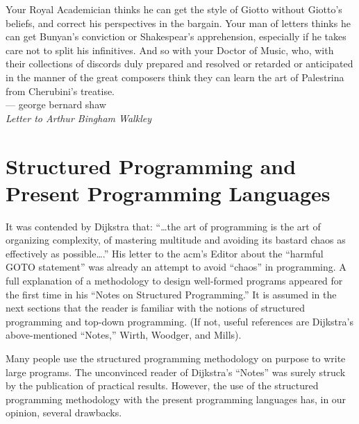 \documentclass[openany,nobib]{tufte-book}
\begin{document}
\newpage\thispagestyle{empty}


\vspace*{\fill}

\begin{flushright}{
    Your Royal Academician thinks he can get the
    style of Giotto without Giotto's beliefs, and
    correct his perspectives in the bargain. Your
    man of letters thinks he can get Bunyan's
    conviction or Shakespear's apprehension,
    especially if he takes care not to split his
    infinitives. And so with your Doctor of Music,
    who, with their collections of discords duly
    prepared and resolved or retarded or anticipated
    in the manner of the great composers think they
    can learn the art of Palestrina from
    Cherubini's treatise.} \\ \medskip
    --- {\sc \large george bernard shaw} \\
    {\sl Letter to Arthur Bingham Walkley}
\end{flushright}

\chapter[Structured Programming and Present Programming Languages]{Structured
Programming and\\Present Programming Languages}\label{ch:introduction}

It was contended by Dijkstra that: ``\dots the art of programming is the art of
organizing complexity, of mastering multitude and avoiding its bastard chaos as
effectively as possible\dots.''\autocite{dijkstra1971short} His letter to the
{\sc acm}'s Editor about the ``harmful GOTO
statement''\autocite{dijkstra1968letters} was already an attempt to avoid
``chaos'' in programming. A full explanation of a methodology to design
well-formed programs appeared for the first time in his ``Notes on Structured
Programming.''\autocite{Dijkstra1970-ja} It is assumed in the next sections
that the reader is familiar with the notions of structured programming and
top-down programming. (If not, useful references are Dijkstra's above-mentioned
``Notes,'' Wirth,\autocite{wirth1971program}
Woodger,\autocite{woodger1971semantic} and
Mills\autocite{mills1972mathematical}).

Many people use the structured programming methodology on purpose to write
large programs. The unconvinced reader of Dijkstra's ``Notes'' was surely
struck by the publication of practical
results.\autocite{baker1972chief}\autocite{baker1972system} However, the use of
the structured programming methodology with the present programming languages
has, in our opinion, several drawbacks.
\end{document}
